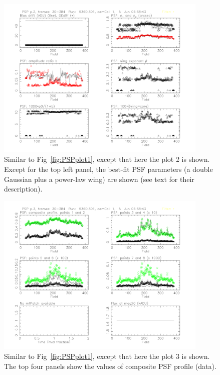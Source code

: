 \documentclass[12pt,preprint]{aastex}
\begin{document}
\begin{figure}
\centering
\includegraphics[width=0.9\textwidth]{FIGURES/psPlots2-005360-r1.pdf}
\caption{Similar to Fig~\ref{fig:PSPplot1}, except that here the plot 2 is shown.
Except for the top left panel, the best-fit PSF parameters (a double Gaussian
plus a power-law wing) are shown (see text for their description). 
\label{fig:PSPplot2}}
\end{figure}


\begin{figure}
\centering
\includegraphics[width=0.9\textwidth]{FIGURES/psPlots3-005360-r1.pdf}
\caption{Similar to Fig~\ref{fig:PSPplot1}, except that here the plot 3 is shown.
The top four panels show the values of composite PSF profile (data).
\label{fig:PSPplot3}}
\end{figure}
\end{document}
